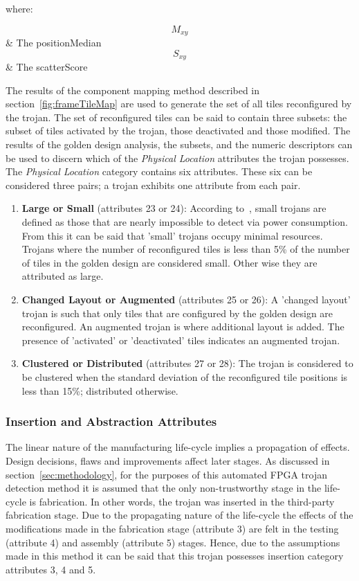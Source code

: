 where:
\begin{conditions}
	$$M_{xy}$$     &  The \gls{positionMedian} \\   
	$$S_{xy}$$     &  The \gls{scatterScore}
\end{conditions}
\normalsize

The results of the component mapping method described in section~\ref{fig:frameTileMap} are used to generate the set of all tiles reconfigured by the trojan.
The set of reconfigured tiles can be said to contain three subsets: the subset of tiles activated by the trojan, those deactivated and those modified. 
The results of the golden design analysis, the subsets, and the numeric descriptors can be used to discern which of the \textit{Physical Location} attributes the trojan possesses. 
The \textit{Physical Location} category contains six attributes.
These six can be considered three pairs; a trojan exhibits one attribute from each pair. 
\begin{enumerate}
	\item \textbf{Large or Small} (attributes 23 or 24): According to~\cite{samerAttribute}, small trojans are defined as those that are nearly impossible to detect via power consumption. From this it can be said that 'small' trojans occupy minimal resources. Trojans where the number of reconfigured tiles is less than 5\% of the number of tiles in the golden design are considered small. Other wise they are attributed as large.
	\item \textbf{Changed Layout or Augmented} (attributes 25 or 26): A 'changed layout' trojan is such that only tiles that are configured by the golden design are reconfigured. An augmented trojan is where additional layout is added. The presence of 'activated' or 'deactivated' tiles indicates an augmented trojan. 
	\item \textbf{Clustered or Distributed} (attributes 27 or 28): The trojan is considered to be clustered when the standard deviation of the reconfigured tile positions is less than 15\%; distributed otherwise.
\end{enumerate}
\subsubsection{Insertion and Abstraction Attributes}
The linear nature of the manufacturing life-cycle implies a propagation of effects.
Design decisions, flaws and improvements affect later stages.
As discussed in section~\ref{sec:methodology}, for the purposes of this automated \acrshort{FPGA} trojan detection method it is assumed that the only non-trustworthy stage in the life-cycle is fabrication.
In other words, the trojan was inserted in the third-party fabrication stage.
Due to the propagating nature of the life-cycle the effects of the modifications made in the fabrication stage (attribute 3) are felt in the testing (attribute 4) and assembly (attribute 5) stages.
Hence, due to the assumptions made in this method it can be said that this trojan possesses insertion category attributes 3, 4 and 5.

